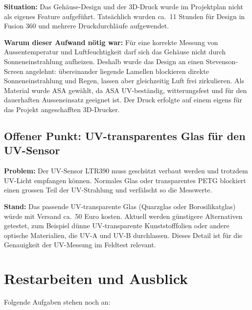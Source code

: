 \documentclass[11pt,a4paper]{scrartcl}
\begin{document}
\textbf{Situation:} Das Gehäuse-Design und der 3D-Druck wurde im Projektplan nicht
als eigenes Feature aufgeführt. Tatsächlich wurden ca.\ 11 Stunden für Design in
Fusion 360 und mehrere Druckdurchläufe aufgewendet.

\textbf{Warum dieser Aufwand nötig war:} Für eine korrekte Messung von
Aussentemperatur und Luftfeuchtigkeit darf sich das Gehäuse nicht durch Sonneneinstrahlung
aufheizen. Deshalb wurde das Design an einen Stevenson-Screen angelehnt: übereinander
liegende Lamellen blockieren direkte Sonneneinstrahlung und Regen, lassen aber
gleichzeitig Luft frei zirkulieren. Als Material wurde ASA gewählt, da ASA
UV-beständig, witterungsfest und für den dauerhaften Ausseneinsatz geeignet ist.
Der Druck erfolgte auf einem eigens für das Projekt angeschafften 3D-Drucker.

\subsection{Offener Punkt: UV-transparentes Glas für den UV-Sensor}

\textbf{Problem:} Der UV-Sensor LTR390 muss geschützt verbaut werden und trotzdem
UV-Licht empfangen können. Normales Glas oder transparentes PETG blockiert einen
grossen Teil der UV-Strahlung und verfälscht so die Messwerte.

\textbf{Stand:} Das passende UV-transparente Glas (Quarzglas oder Borosilikatglas)
würde mit Versand ca.\ 50 Euro kosten. Aktuell werden günstigere Alternativen
getestet, zum Beispiel dünne UV-transparente Kunststofffolien oder andere optische
Materialien, die UV-A und UV-B durchlassen. Dieses Detail ist für die Genauigkeit
der UV-Messung im Feldtest relevant.


\section{Restarbeiten und Ausblick}

Folgende Aufgaben stehen noch an:
\end{document}
